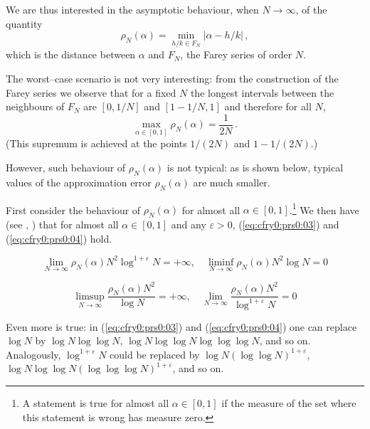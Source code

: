 We are thus interested in the asymptotic behaviour, when $N
\rightarrow \infty$,
of the quantity
 $$
\label{eq:cfry0:prs0:01}
\rho_N(\alpha) = \min_{h/k \in F_N} \left|\alpha - h/k\right|\, ,
$$
which is the distance between $\alpha$ and $F_N$, the Farey
series of order $N$.

The worst--case scenario is not very interesting: from the
construction of the Farey series
we observe that for a fixed $N$ the longest intervals between the
neighbours of  $F_N$
are $[0,1/N]$ and  $[1-1/N,1]$ and therefore for all $N$,
\begin{equation}
\label{eq:cfry0:prs0:02}
\max_{\alpha \in [0,1]} \rho_N(\alpha) = \frac{1}{2N}\, .
\end{equation}
(This supremum is achieved at the points $1/(2N)$ and $1-1/(2N)$.)

However, such behaviour of $\rho_N(\alpha)$ is not typical: as
is shown below,
typical values of the approximation error $\rho_N(\alpha)$ are
much smaller.

First consider the behaviour of $\rho_N(\alpha)$ for almost all
$\alpha \in [0,1]$.\footnote{ A statement is true
for almost all $\alpha \in [0,1]$ if the measure of the set where this
statement is wrong has measure zero.}
We then have (see  \cite{bibref:b:Harman}, \cite{bibref:p:KargaevZ})
that for almost all $\alpha \in [0,1]$ and any $\varepsilon >0$,
(\ref{eq:cfry0:prs0:03}) and (\ref{eq:cfry0:prs0:04}) hold.

\begin{equation}
\label{eq:cfry0:prs0:03}
\lim_{N\rightarrow\infty}\rho_N(\alpha) N^2 \log^{1+\varepsilon} N =
+ \infty, \quad
\liminf_{N\rightarrow\infty}  \rho_N(\alpha) N^2 \log N = 0
\end{equation}

\begin{equation}
\label{eq:cfry0:prs0:04}
\limsup_{N\rightarrow\infty} \frac{ \rho_N(\alpha) N^2 }{ \log N } = +
\infty, \quad
\lim_{N\rightarrow\infty} \frac{ \rho_N(\alpha) N^2 }{
\log^{1+\varepsilon} N } = 0
\end{equation}

Even more is true: in (\ref{eq:cfry0:prs0:03}) and (\ref{eq:cfry0:prs0:04})
one can replace $\log N$ by $\log N \log \log N $, $\log N \log \log
N \log \log \log N$, and so on.
Analogously,   $\log^{1+\varepsilon} N$ could be replaced by
$\log N (\log \log N)^{1+\varepsilon} $, $\log N \log \log N (\log \log
\log N)^{1+\varepsilon}$, and so on.


